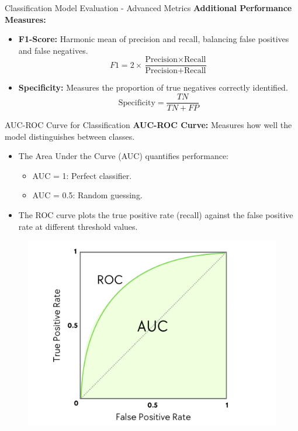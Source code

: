 \documentclass[aspectratio=169,xcolor=dvipsnames]{beamer}
\begin{document}
\begin{frame}{Classification Model Evaluation - Advanced Metrics}
    \textbf{Additional Performance Measures:}
    \begin{itemize}
        \item \textbf{F1-Score:} Harmonic mean of precision and recall, balancing false positives and false negatives.
        \begin{equation}
            F1 = 2 \times \frac{\text{Precision} \times \text{Recall}}{\text{Precision} + \text{Recall}}
        \end{equation}
        \item \textbf{Specificity:} Measures the proportion of true negatives correctly identified.
        \begin{equation}
            \text{Specificity} = \frac{TN}{TN + FP}
        \end{equation}
    \end{itemize}
\end{frame}

\begin{frame}{AUC-ROC Curve for Classification}
    \textbf{AUC-ROC Curve:} Measures how well the model distinguishes between classes.
    \begin{itemize}
        \item The Area Under the Curve (AUC) quantifies performance:
        \begin{itemize}
            \item AUC = 1: Perfect classifier.
            \item AUC = 0.5: Random guessing.
        \end{itemize}
        \item The ROC curve plots the true positive rate (recall) against the false positive rate at different threshold values.
    \end{itemize}
    \begin{figure}
        \centering
        \includegraphics[width=0.4\linewidth]{images/auc_roc_curve.png}
    \end{figure}
\end{frame}
\end{document}

